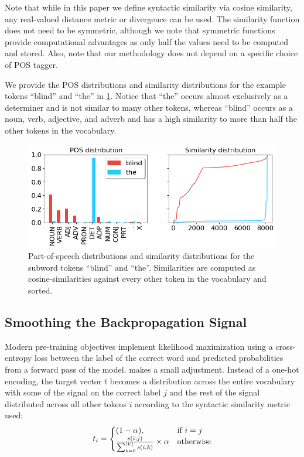 Note that while in this paper we define syntactic similarity via cosine similarity, any real-valued distance metric or divergence can be used. The similarity function does not need to be symmetric, although we note that symmetric functions provide computational advantages as only half the values need to be computed and stored. Also, note that our methodology does not depend on a specific choice of POS tagger.

We provide the POS distributions and similarity distributions for the example tokens ``blind'' and ``the'' in \cref{fig:distributions}. Notice that ``the'' occurs almost exclusively as a determiner and is not similar to many other tokens, whereas ``blind'' occurs as a noun, verb, adjective, and adverb and has a high similarity to more than half the other tokens in the vocabulary.

\begin{figure}[ht!]
    \centering
    \includegraphics[width=0.8\linewidth]{chapters/syntatic-smoothing/figures/distributions.png}
    \caption{Part-of-speech distributions and similarity distributions for the subword tokens ``blind'' and ``the''. Similarities are computed as cosine-similarities against every other token in the vocabulary and sorted.}
    \label{fig:distributions}
    \vspace{-1em}
\end{figure}

\subsection{Smoothing the Backpropagation Signal}\label{section:smoothing}

Modern pre-training objectives implement likelihood maximization using a cross-entropy loss between the label of the correct word and predicted probabilities from a forward pass of the model. \smoothing makes a small adjustment. Instead of a one-hot encoding, the target vector $t$ becomes a distribution across the entire vocabulary with some of the signal on the correct label $j$ and the rest of the signal distributed across all other tokens $i$ according to the syntactic similarity metric used:
\begin{equation}
\label{eq:signal-distribution}
    t_i=\left\{
  \begin{array}{@{}ll@{}}
    (1-\alpha), & \text{if}\ i=j \\
    \frac{s(i,j)}{\sum_{k=0}^{|V|}{s(i,k)}} \times \alpha & \text{otherwise}
  \end{array}\right.
\end{equation}

